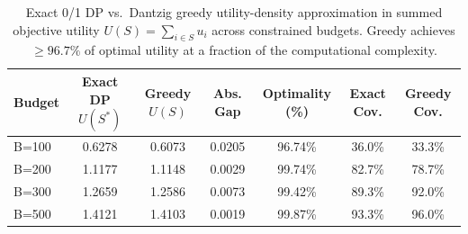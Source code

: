 \begin{table}[t]
\centering
\small
\begin{tabular}{lcccccc}
\toprule
\textbf{Budget} & \textbf{Exact DP} $U(S^*)$ & \textbf{Greedy} $U(S)$ & \textbf{Abs. Gap} & \textbf{Optimality (\%)} & \textbf{Exact Cov.} & \textbf{Greedy Cov.} \\
\midrule
B=100 & 0.6278 & 0.6073 & 0.0205 & 96.74\% & 36.0\% & 33.3\% \\
B=200 & 1.1177 & 1.1148 & 0.0029 & 99.74\% & 82.7\% & 78.7\% \\
B=300 & 1.2659 & 1.2586 & 0.0073 & 99.42\% & 89.3\% & 92.0\% \\
B=500 & 1.4121 & 1.4103 & 0.0019 & 99.87\% & 93.3\% & 96.0\% \\
\bottomrule
\end{tabular}
\caption{Exact 0/1 DP vs.\ Dantzig greedy utility-density approximation in summed objective utility $U(S) = \sum_{i \in S} u_i$ across constrained budgets. Greedy achieves $\ge 96.7\%$ of optimal utility at a fraction of the computational complexity.}
\label{tab:knapsack_optimality_gap}
\end{table}